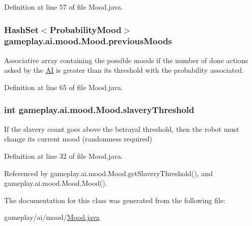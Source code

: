 Definition at line 57 of file Mood.\-java.

\hypertarget{a00015_a5c8758b18bb740a2fd1edf8d57a5ab27}{
\subsubsection[{previous\-Moods}]{\setlength{\rightskip}{0pt plus 5cm}Hash\-Set$<${\bf Probability\-Mood}$>$ gameplay.\-ai.\-mood.\-Mood.\-previous\-Moods\hspace{0.3cm}{\ttfamily [protected]}}}\label{a00015_a5c8758b18bb740a2fd1edf8d57a5ab27}


Associative array containing the possible moods if the number of done actions asked by the \hyperlink{a00001}{A\-I} is greater than its threshold with the probability associated. 



Definition at line 65 of file Mood.\-java.

\hypertarget{a00015_a12c9abed7c077f9013956cda08e41619}{
\subsubsection[{slavery\-Threshold}]{\setlength{\rightskip}{0pt plus 5cm}int gameplay.\-ai.\-mood.\-Mood.\-slavery\-Threshold\hspace{0.3cm}{\ttfamily [protected]}}}\label{a00015_a12c9abed7c077f9013956cda08e41619}


If the slavery count goes above the betrayal threshold, then the robot must change its current mood (randomness required) 



Definition at line 32 of file Mood.\-java.



Referenced by gameplay.\-ai.\-mood.\-Mood.\-get\-Slavery\-Threshold(), and gameplay.\-ai.\-mood.\-Mood.\-Mood().



The documentation for this class was generated from the following file\-:\begin{DoxyCompactItemize}
\item 
gameplay/ai/mood/\hyperlink{a00047}{Mood.\-java}\end{DoxyCompactItemize}

